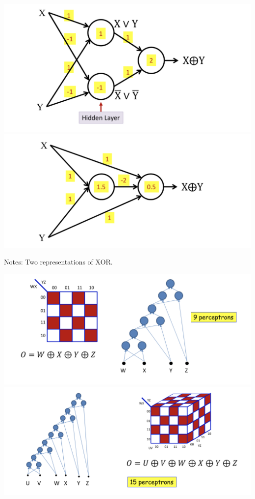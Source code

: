 \documentclass{article}
\begin{document}
	\includegraphics[scale=0.2]{17.png}
	\includegraphics[scale=0.2]{18.png}
	
	Notes: Two representations of XOR.
	
	\includegraphics[scale=0.2]{19.png}
	\includegraphics[scale=0.2]{20.png}
	
\end{document}
